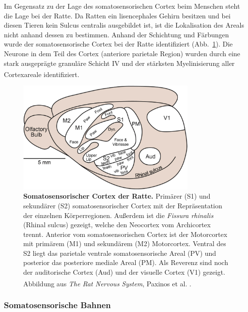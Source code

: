 \documentclass[12pt,a4paper,pdftex]{article}
\begin{document}
Im Gegensatz zu der Lage des somatosensorischen Cortex beim Menschen steht die Lage bei der Ratte. Da Ratten ein lisencephales Gehirn besitzen und bei diesen Tieren kein Sulcus centralis ausgebildet ist, ist die Lokalisation des Areals nicht anhand dessen zu bestimmen. Anhand der Schichtung und Färbungen wurde der somatosensorische Cortex bei der Ratte identifiziert (Abb.~\ref{fig:S1_Cortex_Ratte}). Die Neurone in dem Teil des Cortex (anteriore parietale Region) wurden durch eine stark ausgeprägte granuläre Schicht IV und der stärksten Myelinisierung aller Cortexareale identifiziert. \textsuperscript{\cite[22]{paxinos2014rat}}
\\
\begin{figure}[H]
    \centering
    \includegraphics[width = 0.8\textwidth] {pictures/somatosensory/Somato_cortex_ratte.png}
    \caption[Somatosensorischer Cortex der Ratte]{\textbf{Somatosensorischer Cortex der Ratte.} Primärer (S1) und sekundärer (S2) somatosensorischer Cortex mit der Repräsentation der einzelnen Körperregionen. Außerdem ist die \textit{Fissura rhinalis} (Rhinal sulcus) gezeigt, welche den Neocortex vom Archicortex trennt. Anterior vom somatosensorischen Cortex ist der Motorcortex mit primärem (M1) und sekundärem (M2) Motorcortex. Ventral des S2 liegt das parietale ventrale somatosensorische Areal (PV) und posterior das posteriore mediale Areal (PM). Als Reverenz sind noch der auditorische Cortex (Aud) und der visuelle Cortex (V1) gezeigt. Abbildung aus \textit{The Rat Nervous System}, Paxinos et al. \textsuperscript{\cite[24]{paxinos2014rat}}.}
    \label{fig:S1_Cortex_Ratte}
\end{figure}

\subsubsection*{Somatosensorische Bahnen}
\end{document}
